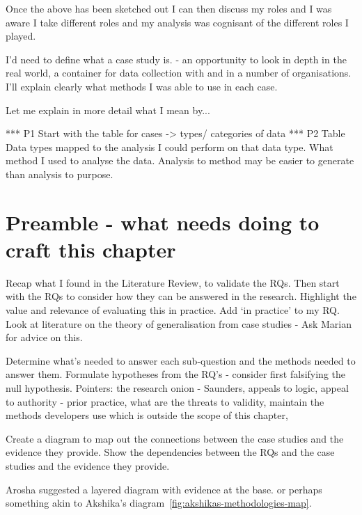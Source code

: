 Once the above has been sketched out I can then discuss my roles and I was aware I take different roles and my analysis was cognisant of the different roles I played.

I'd need to define what a case study is. - an opportunity to look in depth in the real world, a container for data collection with and in a number of organisations. I'll explain clearly what methods I was able to use in each case. 

Let me explain in more detail what I mean by... 

*** P1 Start with the table for cases -> types/ categories of data 
*** P2 Table Data types mapped to the analysis I could perform on that data type. What method I used to analyse the data.
Analysis to method may be easier to generate than analysis to purpose.

\section*{Preamble - what needs doing to craft this chapter}
{\small
Recap what I found in the Literature Review, to validate the RQs. Then start with the RQs to consider how they can be answered in the research. Highlight the value and relevance of evaluating this in practice. Add `in practice' to my RQ. Look at literature on the theory of generalisation from case studies - Ask Marian for advice on this.

Determine what's needed to answer each sub-question and the methods needed to answer them. Formulate hypotheses from the RQ's - consider first falsifying the null hypothesis. Pointers: the research onion - Saunders, appeals to logic, appeal to authority - prior practice, what are the threats to validity, maintain the methods developers use which is outside the scope of this chapter,

Create a diagram to map out the connections between the case studies and the evidence they provide. Show the dependencies between the RQs and the case studies and the evidence they provide.

Arosha suggested a layered diagram with evidence at the base. or perhaps something akin to Akshika's diagram~\ref{fig:akshikas-methodologies-map}.
}

